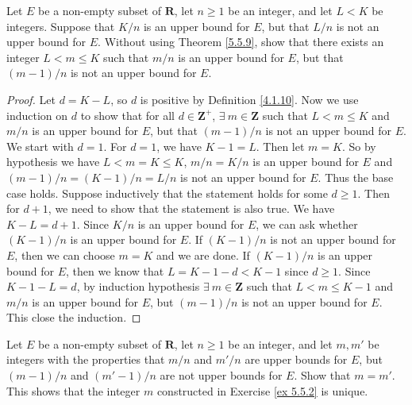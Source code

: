 \begin{exercise}\label{ex 5.5.2}
    Let \(E\) be a non-empty subset of \(\mathbf{R}\), let \(n \geq 1\) be an integer, and let \(L < K\) be integers.
    Suppose that \(K / n\) is an upper bound for \(E\), but that \(L / n\) is not an upper bound for \(E\).
    Without using Theorem \ref{5.5.9}, show that there exists an integer \(L < m \leq K\) such that \(m / n\) is an upper bound for \(E\), but that \((m - 1) / n\) is not an upper bound for \(E\).
\end{exercise}

\begin{proof}
    Let \(d = K - L\), so \(d\) is positive by Definition \ref{4.1.10}.
    Now we use induction on \(d\) to show that for all \(d \in \mathbf{Z}^+\), \(\exists\ m \in \mathbf{Z}\) such that \(L < m \leq K\) and \(m / n\) is an upper bound for \(E\), but that \((m - 1) / n\) is not an upper bound for \(E\).
    We start with \(d = 1\).
    For \(d = 1\), we have \(K - 1 = L\).
    Then let \(m = K\).
    So by hypothesis we have \(L < m = K \leq K\), \(m / n = K / n\) is an upper bound for \(E\) and \((m - 1) / n = (K - 1) / n = L / n\) is not an upper bound for \(E\).
    Thus the base case holds.
    Suppose inductively that the statement holds for some \(d \geq 1\).
    Then for \(d + 1\), we need to show that the statement is also true.
    We have \(K - L = d + 1\).
    Since \(K / n\) is an upper bound for \(E\), we can ask whether \((K - 1) / n\) is an upper bound for \(E\).
    If \((K - 1) / n\) is not an upper bound for \(E\), then we can choose \(m = K\) and we are done.
    If \((K - 1) / n\) is an upper bound for \(E\), then we know that \(L = K - 1 - d < K - 1\) since \(d \geq 1\).
    Since \(K - 1 - L = d\), by induction hypothesis \(\exists\ m \in \mathbf{Z}\) such that \(L < m \leq K - 1\) and \(m / n\) is an upper bound for \(E\), but \((m - 1) / n\) is not an upper bound for \(E\).
    This close the induction.
\end{proof}

\begin{exercise}\label{ex 5.5.3}
    Let \(E\) be a non-empty subset of \(\mathbf{R}\), let \(n \geq 1\) be an integer, and let \(m, m'\) be integers with the properties that \(m / n\) and \(m' / n\) are upper bounds for \(E\), but \((m - 1) / n\) and \((m' - 1) / n\) are not upper bounds for \(E\).
    Show that \(m = m'\).
    This shows that the integer \(m\) constructed in Exercise \ref{ex 5.5.2} is unique.
\end{exercise}


